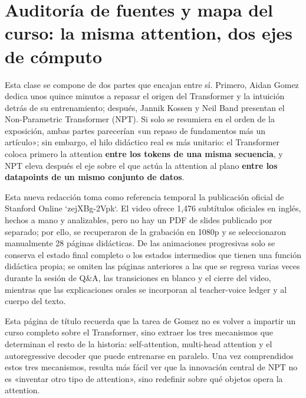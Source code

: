 \section{Auditoría de fuentes y mapa del curso: la misma attention, dos ejes de cómputo}

Esta clase se compone de dos partes que encajan entre sí. Primero, Aidan Gomez dedica unos quince minutos a repasar el origen del Transformer y la intuición detrás de su entrenamiento; después, Jannik Kossen y Neil Band presentan el Non-Parametric Transformer (NPT). Si solo se resumiera en el orden de la exposición, ambas partes parecerían «un repaso de fundamentos más un artículo»; sin embargo, el hilo didáctico real es más unitario: el Transformer coloca primero la attention \textbf{entre los tokens de una misma secuencia}, y NPT eleva después el eje sobre el que actúa la attention al plano \textbf{entre los datapoints de un mismo conjunto de datos}.

Esta nueva redacción toma como referencia temporal la publicación oficial de Stanford Online `zejXBg-2Vpk`. El video ofrece 1,476 subtítulos oficiales en inglés, hechos a mano y analizables, pero no hay un PDF de slides publicado por separado; por ello, se recuperaron de la grabación en 1080p y se seleccionaron manualmente 28 páginas didácticas. De las animaciones progresivas solo se conserva el estado final completo o los estados intermedios que tienen una función didáctica propia; se omiten las páginas anteriores a las que se regresa varias veces durante la sesión de Q\&A, las transiciones en blanco y el cierre del video, mientras que las explicaciones orales se incorporan al teacher-voice ledger y al cuerpo del texto.


Esta página de título recuerda que la tarea de Gomez no es volver a impartir un curso completo sobre el Transformer, sino extraer los tres mecanismos que determinan el resto de la historia: self-attention, multi-head attention y el autoregressive decoder que puede entrenarse en paralelo. Una vez comprendidos estos tres mecanismos, resulta más fácil ver que la innovación central de NPT no es «inventar otro tipo de attention», sino redefinir sobre qué objetos opera la attention.


